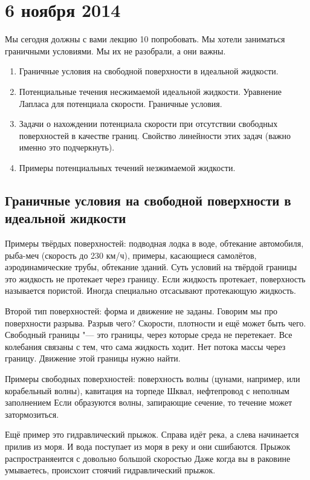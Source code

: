 \section{6 ноября 2014}
Мы сегодня должны с вами лекцию 10 попробовать. Мы хотели заниматься граничными условиями. Мы их не разобрали, а они важны.

\begin{enumerate}
  \item Граничные условия на свободной поверхности в идеальной жидкости.
  \item Потенциальные течения несжимаемой идеальной жидкости. Уравнение Лапласа для потенциала скорости. Граничные условия.
  \item Задачи о нахождении потенциала скорости при отсутствии свободных поверхностей в качестве границ. Свойство линейности этих задач (важно именно это подчеркнуть).
  \item Примеры потенциальных течений незжимаемой жидкости.
\end{enumerate}

\subsection{Граничные условия на свободной поверхности в идеальной жидкости}
  Примеры твёрдых поверхностей: подводная лодка в воде, обтекание автомобиля, рыба-меч (скорость до 230 км/ч), примеры, касающиеся самолётов, аэродинамические трубы, обтекание зданий. Суть условий на твёрдой границы это жидкость не протекает через границу. Если жидкость протекает, поверхность называется пористой. Иногда специально отсасывают протекающую жидкость.

Второй тип поверхностей: форма и движение не заданы. Говорим мы про поверхности разрыва.
Разрыв чего? Скорости, плотности и ещё может быть чего. Свободный границы "--- это границы, через которые среда не перетекает. Все колебания связаны с тем, что сама жидкость ходит. Нет потока массы через границу. Движение этой границы нужно найти.

Примеры свободных поверхностей: поверхность волны (цунами, например, или корабельный волны), кавитация на торпеде Шквал,
нефтепровод с неполным заполнением
Если образуются волны, запирающие сечение, то течение может затормозиться.

Ещё пример это гидравлический прыжок. Справа идёт река, а слева начинается прилив из моря. И вода поступает из моря в реку и они сшибаются.
 Прыжок распространяеится с довольно большой скоростью
Даже когда вы в раковине умываетесь, происхоит стоячий гидравлический прыжок.

